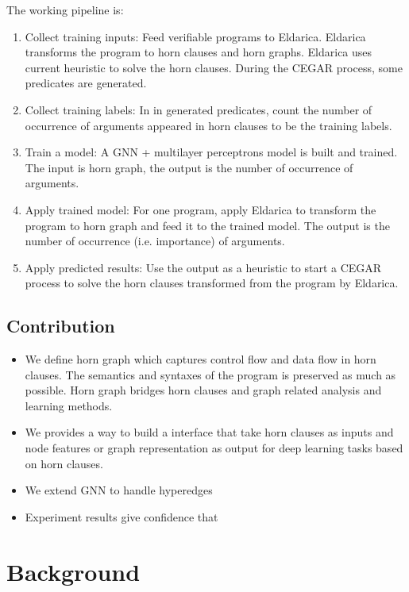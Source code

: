 \documentclass{article}
\begin{document}
The working pipeline is:
\begin{enumerate}
  \item Collect training inputs: Feed verifiable programs to Eldarica. Eldarica transforms the program to horn clauses and horn graphs. Eldarica uses current heuristic to solve the horn clauses. During the CEGAR process, some predicates are generated.
  \item Collect training labels: In in generated predicates, count the number of occurrence of arguments appeared in horn clauses to be the training labels.
  \item Train a model: A GNN + multilayer perceptrons model is built and trained. The input is horn graph, the output is the number of occurrence of arguments.
  \item Apply trained model: For one program, apply Eldarica to transform the program to horn graph and feed it to the trained model. The output is the number of occurrence (i.e. importance) of arguments.
  \item Apply predicted results: Use the output as a heuristic to start a CEGAR process to solve the horn clauses transformed from the program by Eldarica.
\end{enumerate}



\subsection{Contribution}

\begin{itemize}
  \item We define horn graph which captures control flow and data flow in horn clauses. The semantics and syntaxes of the program is preserved as much as possible. Horn graph bridges horn clauses and graph related analysis and learning methods.
  \item We provides a way to build a interface that take horn clauses as inputs and node features or graph representation as output for deep learning tasks based on horn clauses.
  \item We extend GNN to handle hyperedges
  \item Experiment results give confidence that
\end{itemize}

\section{Background}
\end{document}
